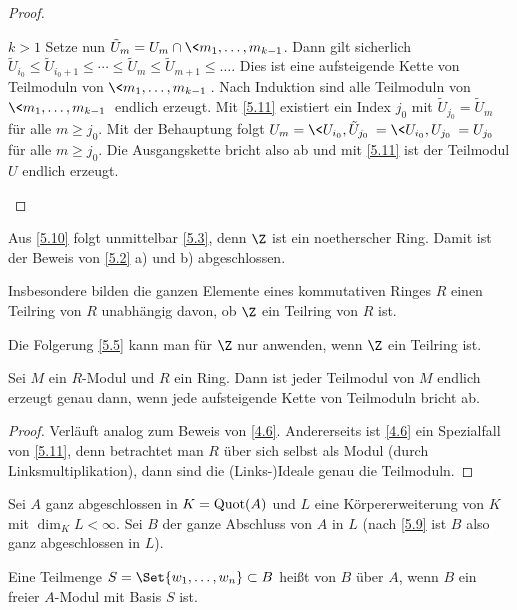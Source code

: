 \begin{st}
\begin{proof}
\begin{seg}{$k > 1$}
			Setze nun $\tilde U_m = U_m \cap \<m_1, \dotsc, m_{k-1}$.
			Dann gilt sicherlich $\tilde U_{i_0} \le \tilde U_{i_0 + 1} \le \dotsb \le \tilde U_m \le \tilde U_{m+1} \le \dotsc $.
			Dies ist eine aufsteigende Kette von Teilmoduln von $\<m_1, \dotsc, m_{k-1}\>$.
			Nach Induktion sind alle Teilmoduln von $\<m_1, \dotsc, m_{k-1}\>$ endlich erzeugt.
			Mit \ref{5.11} existiert ein Index $j_0$ mit $\tilde U_{j_0} = \tilde U_m$ für alle $m \ge j_0$.
			Mit der Behauptung folgt $U_m = \<U_{i_0}, \tilde U_{j_0}\> = \<U_{i_0}, U_{j_0}\> = U_{j_0}$ für alle $m \ge j_0$.
			Die Ausgangskette bricht also ab und mit \ref{5.11} ist der Teilmodul $U$ endlich erzeugt.
		\end{seg}
	\end{proof}
	\begin{note}
		Aus \ref{5.10} folgt unmittelbar \ref{5.3}, denn $\Z$ ist ein noetherscher Ring.
		Damit ist der Beweis von \ref{5.2} a) und b) abgeschlossen.

		Insbesondere bilden die ganzen Elemente eines kommutativen Ringes $R$ einen Teilring von $R$ unabhängig davon, ob $\Z$ ein Teilring von $R$ ist.

		Die Folgerung \ref{5.5} kann man für $\Z$ nur anwenden, wenn $\Z$ ein Teilring ist.
	\end{note}
\end{st}

\begin{lem} \label{5.11}
	Sei $M$ ein $R$-Modul und $R$ ein Ring.
	Dann ist jeder Teilmodul von $M$ endlich erzeugt genau dann, wenn jede aufsteigende Kette von Teilmoduln bricht ab.
	\begin{proof}
		Verläuft analog zum Beweis von \ref{4.6}.
		Andererseits ist \ref{4.6} ein Spezialfall von \ref{5.11}, denn betrachtet man $R$ über sich selbst als Modul (durch Linksmultiplikation), dann sind die (Links-)Ideale genau die Teilmoduln.
	\end{proof}
\end{lem}

\begin{st} \label{5.12}
	Sei $A$ ganz abgeschlossen in $K = \operatorname{Quot}(A)$ und $L$ eine Körpererweiterung von $K$ mit $\dim_K L < \infty$.
	Sei $B$ der ganze Abschluss von $A$ in $L$ (nach \ref{5.9} ist $B$ also ganz abgeschlossen in $L$).

	Eine Teilmenge $S = \Set{ w_1, \dotsc, w_n } \subset B$ heißt  von $B$ über $A$, wenn $B$ ein freier $A$-Modul mit Basis $S$ ist.
\end{st}

